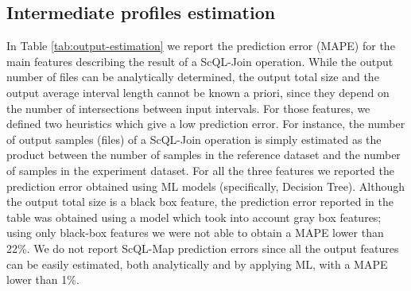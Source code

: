 \documentclass[a4paper, 10pt, conference]{ieeeconf}      %
\begin{document}
\subsection{Intermediate profiles estimation}
\label{subsec:results-profile}
In Table \ref{tab:output-estimation} we report the prediction error (MAPE) for the main features describing the result of a ScQL-Join operation.
While the output number of files can be analytically determined, the output total size and the output average interval length cannot be known a priori, since they depend on the number of intersections between input intervals. For those features, we defined two heuristics which give a low prediction error. \color{black} For instance, the number of output samples (files) of  a ScQL-Join operation is simply estimated as the product between the number of samples in the reference dataset and the number of samples in the experiment dataset. \color{black}  For all the three features we reported the prediction error obtained using ML models (specifically, Decision Tree). Although the output total size is a black box feature, the prediction error reported in the table was obtained using a model which took into account gray box features; using only black-box features we were not able to obtain a  MAPE lower than 22\%. We do not report ScQL-Map prediction errors since all the output features can be easily estimated, both analytically and by applying ML, \color{black}with a MAPE lower than 1\%.\color{black}
\end{document}
